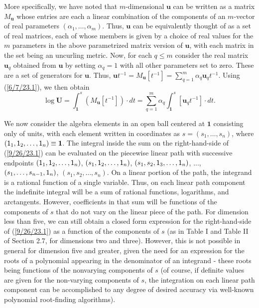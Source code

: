 \documentclass{amsart}
\numberwithin{equation}{section}
\theoremstyle{definition}
\numberwithin{theorem}{section}
\begin{document}
More specifically, we have noted that $m$-dimensional $\mathbf{u}$ can be written as a matrix $M_\mathbf{u}$ whose entries are each a linear combination of the components of an $m$-vector of real parameters $(\alpha_1, \dots, \alpha_m)$.   Thus, $\mathbf{u}$ can be equivalently thought of as a set of real matrices, each of whose members is given by a choice of real values for the $m$ parameters in the above parametrized matrix version of $\mathbf{u}$, with each matrix in the set being an uncurling metric.  Now, for each $q\le m$ consider the real matrix  $\mathbf{u}_q$ obtained from $\mathbf{u}$ by setting $\alpha_q =1$ with all other parameters set to zero.  These are a set of generators for $\mathbf{u}$. Thus, $\mathbf{u}t^{-1} = M_{\mathbf{u}}[t^{-1}] = \sum_{q=1}^m \alpha_q \mathbf{u}_q t^{-1}$.   Using (\ref{6/7/23.1}), we then obtain \begin{equation}\label{9/26/23.1} \log  \mathbf{U} = \int_{\mathbf{1}}^s (M_{\mathbf{u}} [t^{-1}])\cdot dt =\sum_{q=1}^m \alpha_q \int_{\mathbf{1}}^s [\mathbf{u}_q t^{-1}]\cdot dt.\end{equation}  

We now consider the algebra elements in an open ball centered at $\mathbf{1}$ consisting only of units, with each element written in coordinates as $s = (s_1,\dots,s_n)$, where $({\sf 1}_1,{\sf 1}_2,\dots,{\sf 1}_n) \equiv \mathbf{1}$.  The integral inside the sum on the right-hand-side of (\ref{9/26/23.1}) can be evaluated on the piecewise linear path with successive endpoints $({\sf 1}_1,{\sf 1}_2,\dots,{\sf 1}_n)$, $(s_1,{\sf 1}_2,\dots,{\sf 1}_n)$, $(s_1,s_2,{\sf 1}_3,\dots,{\sf 1}_n)$,  $\dots$, $(s_1,\dots, s_{n-1}, {\sf 1}_n)$, $(s_1,s_2,\dots,s_n)$.    On a linear portion of the path, the integrand is a rational function of a single variable.  Thus, on each linear path component the indefinite integral will be a sum of rational functions, logarithms, and arctangents.  However, coefficients in that sum will be functions of the components of $s$ that do not vary on the linear piece of the path.  For dimension less than five, we can still obtain a closed form expression for the right-hand-side of (\ref{9/26/23.1}) as a function of the components of $s$ (as in Table I and Table II of Section 2.7, for dimensions two and three).  However, this is not possible in general for dimension five and greater, given the need for an expression for the roots of a polynomial appearing in the denominator of an integrand - these roots being functions of the nonvarying components of $s$ (of course, if definite values are given for the non-varying components of $s$, the integration on each linear path component can be accomplished to any degree of desired accuracy via well-known polynomial root-finding algorithms).
\end{document}
